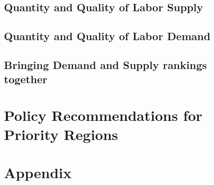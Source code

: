 \documentclass[alpha-refs]{wiley-article-03v}
\begin{document}
\lipsum[1]

\subsection{Quantity and Quality of Labor Supply}


\lipsum[2]

\subsection{Quantity and Quality of Labor Demand}

\lipsum[3]

\subsection{Bringing Demand and Supply rankings together}

\lipsum[4]

\section{Policy Recommendations for Priority Regions} 

\printbibliography

\newpage
\section*{Appendix}
%

\setcounter{table}{0}
\renewcommand{\thetable}{A\arabic{table}}
\end{document}
